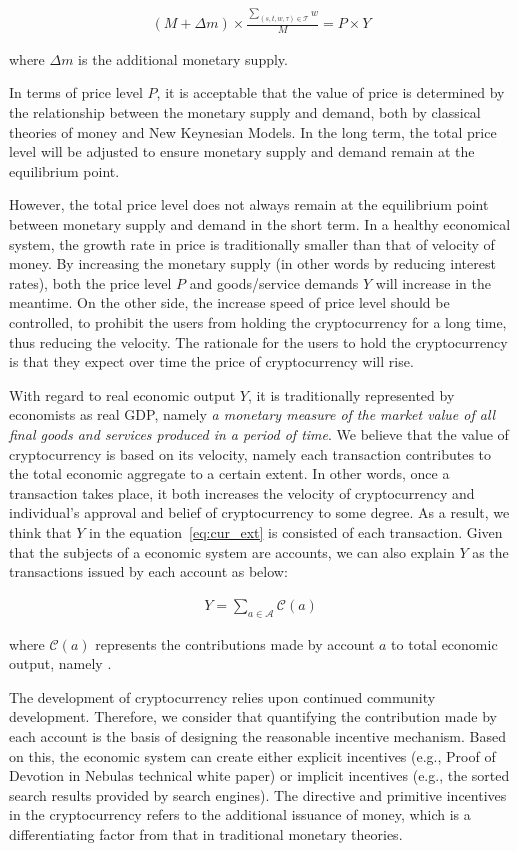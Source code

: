 \begin{align}
(M + \Delta{m}) \times \frac{\sum_{(s, t, w, \tau)\in \mathcal{T}}{w}}{M} = P \times Y
\label{eq:cur_ext}
\end{align}

\noindent where $\Delta{m}$ is the additional monetary supply. 

In terms of price level $P$, it is acceptable that the value of price is determined by the relationship between the monetary supply and demand, both by classical theories of money and New Keynesian Models. In the long term, the total price level will be adjusted to ensure monetary supply and demand remain at the equilibrium point.

However, the total price level does not always remain at the equilibrium point between monetary supply and demand in the short term. In a healthy economical system, the growth rate in price is traditionally smaller than that of velocity of money. By increasing the monetary supply (in other words by reducing interest rates), both the price level $P$ and goods/service demands $Y$ will increase in the meantime. On the other side, the increase speed of price level should be controlled, to prohibit the users from holding the cryptocurrency for a long time, thus reducing the velocity. The rationale for the users to hold the cryptocurrency is that they expect over time the price of cryptocurrency will rise.


With regard to real economic output $Y$, it is traditionally represented by economists as real GDP, namely \emph{a monetary measure of the market value of all final goods and services produced in a period of time}. We believe that the value of cryptocurrency is based on its velocity, namely each transaction contributes to the total economic aggregate to a certain extent. In other words, once a transaction takes place, it both increases the velocity of cryptocurrency and individual's approval and belief of cryptocurrency to some degree. As a result, we think that $Y$ in the equation~\ref{eq:cur_ext} is consisted of each transaction. Given that the subjects of a economic system are accounts, we can also explain $Y$ as the transactions issued by each account as below:

\begin{align}
Y=\sum_{a\in \mathcal{A}} \mathcal{C}(a)
\end{align}

\noindent where $\mathcal{C}(a)$ represents the contributions made by account $a$ to total economic output, namely \nrcore.

The development of cryptocurrency relies upon continued community development. Therefore, we consider that quantifying the contribution made by each account is the basis of designing the reasonable incentive mechanism. Based on this, the economic system can create either explicit incentives (e.g., Proof of Devotion in Nebulas technical white paper) or implicit incentives (e.g., the sorted search results provided by search engines). 
The directive and primitive incentives in the cryptocurrency refers to the additional issuance of money, which is a differentiating factor from that in traditional monetary theories.